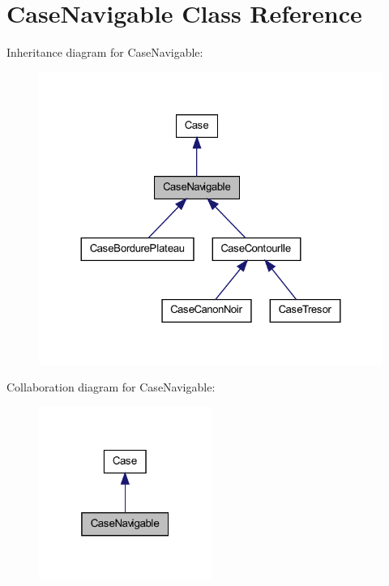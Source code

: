 \hypertarget{class_case_navigable}{
\section{CaseNavigable Class Reference}
\label{class_case_navigable}
}


Inheritance diagram for CaseNavigable:
\nopagebreak
\begin{figure}[H]
\begin{center}
\leavevmode
\includegraphics[width=324pt]{class_case_navigable__inherit__graph}
\end{center}
\end{figure}


Collaboration diagram for CaseNavigable:
\nopagebreak
\begin{figure}[H]
\begin{center}
\leavevmode
\includegraphics[width=160pt]{class_case_navigable__coll__graph}
\end{center}
\end{figure}
